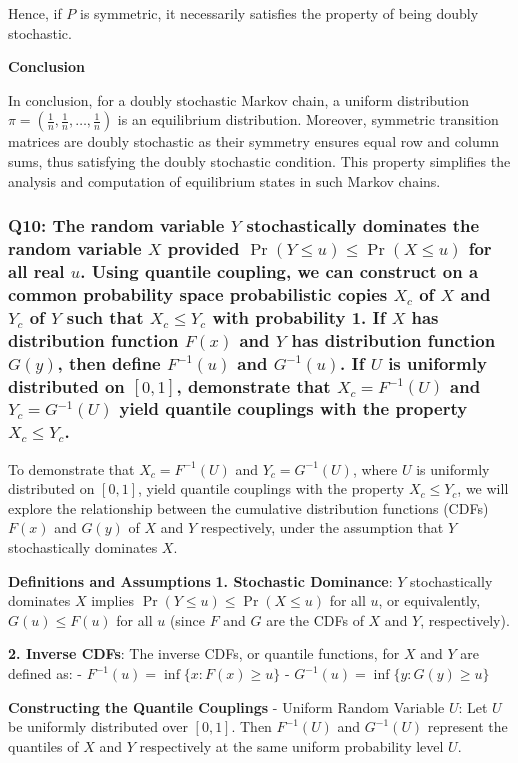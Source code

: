 \documentclass[8pt]{article}
\begin{document}
Hence, if \(P\) is symmetric, it necessarily satisfies the property of being doubly stochastic.

\textbf{Conclusion}

In conclusion, for a doubly stochastic Markov chain, a uniform distribution \(\pi = \left(\frac{1}{n}, \frac{1}{n}, \ldots, \frac{1}{n}\right)\) is an equilibrium distribution. Moreover, symmetric transition matrices are doubly stochastic as their symmetry ensures equal row and column sums, thus satisfying the doubly stochastic condition. This property simplifies the analysis and computation of equilibrium states in such Markov chains.

\subsubsection*{Q10:
The random variable \(Y\) stochastically dominates the random variable \(X\) provided \(\Pr(Y \leq u) \leq \Pr(X \leq u)\) for all real \(u\). Using quantile coupling, we can construct on a common probability space probabilistic copies \(X_c\) of \(X\) and \(Y_c\) of \(Y\) such that \(X_c \leq Y_c\) with probability 1. If \(X\) has distribution function \(F(x)\) and \(Y\) has distribution function \(G(y)\), then define \(F^{-1}(u)\) and \(G^{-1}(u)\). If \(U\) is uniformly distributed on \([0, 1]\), demonstrate that \(X_c = F^{-1}(U)\) and \(Y_c = G^{-1}(U)\) yield quantile couplings with the property \(X_c \leq Y_c\).}

To demonstrate that \(X_c = F^{-1}(U)\) and \(Y_c = G^{-1}(U)\), where \(U\) is uniformly distributed on \([0, 1]\), yield quantile couplings with the property \(X_c \leq Y_c\), we will explore the relationship between the cumulative distribution functions (CDFs) \(F(x)\) and \(G(y)\) of \(X\) and \(Y\) respectively, under the assumption that \(Y\) stochastically dominates \(X\).

\textbf{Definitions and Assumptions}
\textbf{1. Stochastic Dominance}: \(Y\) stochastically dominates \(X\) implies \(\Pr(Y \leq u) \leq \Pr(X \leq u)\) for all \(u\), or equivalently, \(G(u) \leq F(u)\) for all \(u\) (since \(F\) and \(G\) are the CDFs of \(X\) and \(Y\), respectively).

\textbf{2. Inverse CDFs}: The inverse CDFs, or quantile functions, for \(X\) and \(Y\) are defined as:
   - \(F^{-1}(u) = \inf \{ x : F(x) \geq u \}\)
   - \(G^{-1}(u) = \inf \{ y : G(y) \geq u \}\)

\textbf{Constructing the Quantile Couplings}
- Uniform Random Variable \(U\): Let \(U\) be uniformly distributed over \([0, 1]\). Then \(F^{-1}(U)\) and \(G^{-1}(U)\) represent the quantiles of \(X\) and \(Y\) respectively at the same uniform probability level \(U\).
\end{document}
